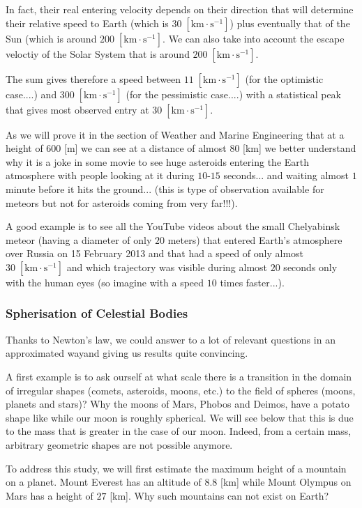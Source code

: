 	In fact, their real entering velocity depends on their direction that will determine their relative speed to Earth (which is ${30  \;[\text{km}\cdot \text{s}^{-1}]}$) plus eventually that of the Sun (which is around ${200  \;[\text{km}\cdot \text{s}^{-1}]}$. We can also take into account the escape veloctiy of the Solar System that is around  ${200  \;[\text{km}\cdot \text{s}^{-1}]}$.

	The sum gives therefore a speed between ${11 \;[\text{km}\cdot \text{s}^{-1}]}$ (for the optimistic case....) and ${300  \;[\text{km}\cdot \text{s}^{-1}]}$ (for the pessimistic case....) with a statistical peak that gives most observed entry at ${30 \;[\text{km}\cdot \text{s}^{-1}]}$.

	As we  will prove it in the section of Weather and Marine Engineering that at a height of $600$ [m] we can see at a distance of almost $80$ [km] we better understand why it is a joke in some movie to see huge asteroids entering the Earth atmosphere with people looking at it during $10$-$15$ seconds... and waiting almost $1$ minute before it hits the ground... (this is type of observation available for meteors but not for asteroids coming from very far!!!).

	A good example is to see all the YouTube videos about the small Chelyabinsk meteor (having a diameter of only $20$ meters) that entered Earth's atmosphere over Russia on 15 February 2013 and that had a speed of only almost  $30 \;[\text{km}\cdot \text{s}^{-1}]$ and which trajectory was visible during almost $20$ seconds only with the human eyes (so imagine with a speed $10$ times faster...).

	\subsubsection{Spherisation of Celestial Bodies}
	Thanks to Newton's law, we could answer to a lot of relevant questions in an approximated wayand giving us results quite convincing.

	A first example is to ask ourself at what scale there is a transition in the domain of irregular shapes (comets, asteroids, moons, etc.) to the field of spheres (moons, planets and stars)? Why the moons of Mars, Phobos and Deimos, have a potato shape like while our moon is roughly spherical. We will see below that this is due to the mass that is greater in the case of our moon. Indeed, from a certain mass, arbitrary geometric shapes are not possible anymore.

	To address this study, we will first estimate the maximum height of a mountain on a planet. Mount Everest has an altitude of $8.8$ [km] while Mount Olympus on Mars has a height of $27$ [km]. Why such mountains can not exist on Earth?

